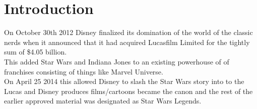 


\section{Introduction}
On October 30th 2012 Disney finalized its domination of the world of the classic nerds when it announced that it had acquired Lucasfilm Limited for the tightly sum of \$4.05 billion.\\
\- This added Star Wars and Indiana Jones to an existing powerhouse of of franchises consisting of things like Marvel Universe.\\
\- On April 25 2014 this allowed Disney to slash the Star Wars story into to the Lucas and Disney produces films/cartoons became the canon and the rest of the earlier approved material was designated as Star Wars Legends.